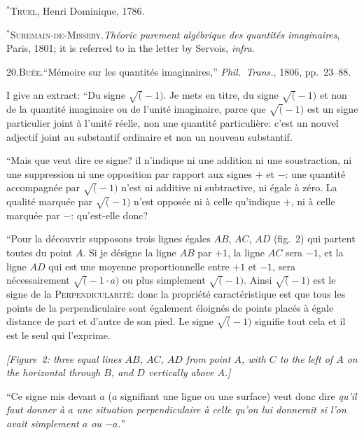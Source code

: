 \documentclass[11pt]{article}
\begin{document}
\smallskip

$^{*}$\textsc{Truel}, Henri Dominique, 1786.

\smallskip

$^{*}$\textsc{Suremain-de-Missery.}\quad \textit{Th\'eorie purement alg\'ebrique des quantit\'es imaginaires}, Paris, 1801; it is referred to in the letter by Servois, \textit{infra}.

\smallskip

20.\quad \textsc{Bu\'ee.}\quad ``M\'emoire sur les quantit\'es imaginaires,'' \textit{Phil.\ Trans.}, 1806, pp.~23--88.

I give an extract: ``Du signe $\surd(-1)$. Je mets en titre, du signe $\surd(-1)$ et non de la quantit\'e imaginaire ou de l'unit\'e imaginaire, parce que $\surd(-1)$ est un signe particulier joint \`a l'unit\'e r\'eelle, non une quantit\'e particuli\`ere: c'est un nouvel adjectif joint au substantif ordinaire et non un nouveau substantif.

``Mais que veut dire ce signe? il n'indique ni une addition ni une soustraction, ni une suppression ni une opposition par rapport aux signes $+$ et $-$: une quantit\'e accompagn\'ee par $\surd(-1)$ n'est ni additive ni subtractive, ni \'egale \`a z\'ero. La qualit\'e marqu\'ee par $\surd(-1)$ n'est oppos\'ee ni \`a celle qu'indique $+$, ni \`a celle marqu\'ee par $-$: qu'est-elle donc?

``Pour la d\'ecouvrir supposons trois lignes \'egales $AB$, $AC$, $AD$ (fig.~2) qui partent toutes du point $A$. Si je d\'esigne la ligne $AB$ par $+1$, la ligne $AC$ sera $-1$, et la ligne $AD$ qui est une moyenne proportionnelle entre $+1$ et $-1$, sera n\'ecessairement $\surd(-1\cdot a)$ ou plus simplement $\surd(-1)$. Ainsi $\surd(-1)$ est le signe de la \textsc{Perpendicularit\'e}: donc la propri\'et\'e caract\'eristique est que tous les points de la perpendiculaire sont \'egalement \'eloign\'es de points plac\'es \`a \'egale distance de part et d'autre de son pied. Le signe $\surd(-1)$ signifie tout cela et il est le seul qui l'exprime.
\begin{center}\textit{[Figure~2: three equal lines $AB$, $AC$, $AD$ from point $A$, with $C$ to the left of $A$ on the horizontal through $B$, and $D$ vertically above $A$.]}\end{center}

``Ce signe mis devant $a$ ($a$ signifiant une ligne ou une surface) veut donc dire \textit{qu'il faut donner \`a $a$ une situation perpendiculaire \`a celle qu'on lui donnerait si l'on avait simplement $a$ ou $-a$.}''
\end{document}
